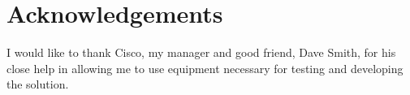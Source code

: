 \section*{Acknowledgements}
I would like to thank Cisco, my manager and good friend, Dave Smith, for his
close help in allowing me to use equipment necessary for testing and developing the solution.